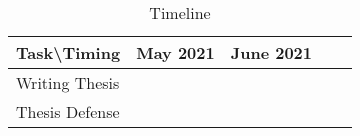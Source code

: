 \begin{table}[h!]
\begin{center}
    \begin{tabular}{|l|l|l|l|l|}
    \hline
    Task\textbackslash{}Timing & May 2021                                      & June 2021                 \\ \hline
    Writing Thesis             & \cellcolor[HTML]{6665CD}{\color[HTML]{333333} } &                          \\ \hline
    Thesis Defense             &                                                 & \cellcolor[HTML]{67FD9A} \\ \hline
    \end{tabular}
\end{center}
\caption{Timeline}
\end{table}